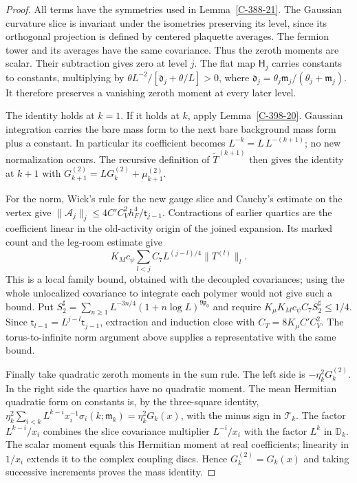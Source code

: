 \documentclass[11pt,letterpaper,reqno]{amsart}
\theoremstyle{definition}
\theoremstyle{remark}
\begin{document}
\begin{proof}
All terms have the symmetries used in
Lemma~\ref{C-388-21}.  The Gaussian curvature slice is
invariant under the isometries preserving its level, since
its orthogonal projection is defined by centered plaquette
averages.  The fermion tower and its averages have the same
covariance.  Thus the zeroth moments are scalar.  Their
subtraction gives zero at level $j$.  The flat map
$\mathsf H_j$ carries constants to constants, multiplying
by
$\theta L^{-2}/[\mathfrak d_j+\theta/L]>0$, where
$\mathfrak d_j=\theta_j\mathfrak m_j/(\theta_j+\mathfrak m_j)$.
It therefore preserves a vanishing zeroth moment at every
later level.

The identity holds at $k=1$.  If it holds at $k$, apply
Lemma~\ref{C-398-20}.  Gaussian integration carries the
bare mass form to the next bare background mass form plus
a constant.  In particular its coefficient becomes
$L^{-k}=L\,L^{-(k+1)}$; no new normalization occurs.
The recursive definition of $\widetilde T^{(k+1)}$ then
gives the identity at $k+1$ with
$G_{k+1}^{(2)}=LG_k^{(2)}+\mu_{k+1}^{(2)}$.

For the norm, Wick's rule for the new gauge slice and
Cauchy's estimate on the vertex give
$\|\mathscr A_j\|_j\le4C'C_V^2h_F^4/\mathsf t_{j-1}$.
Contractions of earlier quartics are the coefficient linear
in the old-activity origin of the joined expansion.  Its
marked count and the leg-room estimate give
\[
 K_Mc_\psi\sum_{l<j}C_7L^{(j-l)/4}\|T^{(l)}\|_l.
\]
This is a local family bound, obtained with the decoupled
covariances; using the whole unlocalized covariance to
integrate each polymer would not give such a bound.
Put
$S_2^\sharp=\sum_{n\ge1}L^{-3n/4}(1+n\log L)^{9\mathfrak p_0}$
and require
$K_\mu K_Mc_\psi C_7S_2^\sharp\le1/4$.
Since $\mathsf t_{l-1}=L^{j-l}\mathsf t_{j-1}$, extraction and induction
close with $C_T=8K_\mu C'C_V^2$.
The torus-to-infinite norm argument above supplies a
representative with the same bound.

Finally take quadratic zeroth moments in the sum rule.
The left side is $-\eta_k^2G_k^{(2)}$.  In the right side
the quartics have no quadratic moment.  The mean Hermitian
quadratic form on constants is, by the three-square identity,
$\eta_k^2\sum_{i<k}L^{k-i}x_i^{-1}
\sigma_i(k;\mathfrak m_k)=\eta_k^2G_k(x)$, with the minus
sign in $\mathscr T_k$. The factor $L^{k-i}/x_i$ combines the
slice covariance multiplier $L^{-i}/x_i$ with the factor $L^k$
in $\mathbb D_k$. The scalar moment equals this
Hermitian moment at real coefficients; linearity in
$1/x_i$ extends it to the complex coupling discs.
Hence $G_k^{(2)}=G_k(x)$ and taking successive increments
proves the mass identity.
\end{proof}
\end{document}

